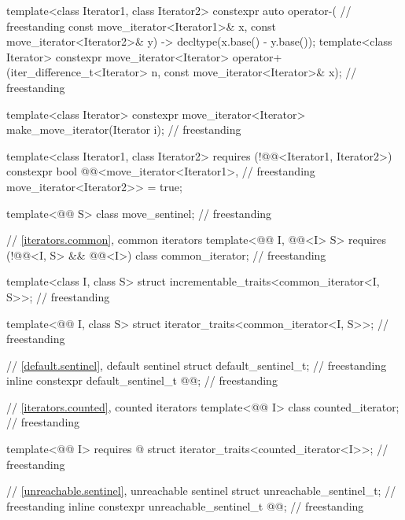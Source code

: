 \begin{codeblock}
{  template<class Iterator1, class Iterator2>
    constexpr auto operator-(                                                       // freestanding
      const move_iterator<Iterator1>& x, const move_iterator<Iterator2>& y)
        -> decltype(x.base() - y.base());
  template<class Iterator>
    constexpr move_iterator<Iterator>
      operator+(iter_difference_t<Iterator> n, const move_iterator<Iterator>& x);   // freestanding

  template<class Iterator>
    constexpr move_iterator<Iterator> make_move_iterator(Iterator i);               // freestanding

  template<class Iterator1, class Iterator2>
    requires (!@@<Iterator1, Iterator2>)
    constexpr bool @@<move_iterator<Iterator1>,             // freestanding
                                              move_iterator<Iterator2>> = true;

  template<@@ S> class move_sentinel;                                      // freestanding

  // \ref{iterators.common}, common iterators
  template<@@ I, @@<I> S>
    requires (!@@<I, S> && @@<I>)
      class common_iterator;                                                        // freestanding

  template<class I, class S>
    struct incrementable_traits<common_iterator<I, S>>;                             // freestanding

  template<@@ I, class S>
    struct iterator_traits<common_iterator<I, S>>;                                  // freestanding

  // \ref{default.sentinel}, default sentinel
  struct default_sentinel_t;                                                        // freestanding
  inline constexpr default_sentinel_t @@{};                           // freestanding

  // \ref{iterators.counted}, counted iterators
  template<@@ I> class counted_iterator;                      // freestanding

  template<@@ I>
    requires @\seebelow@
    struct iterator_traits<counted_iterator<I>>;                                    // freestanding

  // \ref{unreachable.sentinel}, unreachable sentinel
  struct unreachable_sentinel_t;                                                    // freestanding
  inline constexpr unreachable_sentinel_t @@{};                   // freestanding

}
\end{codeblock}
